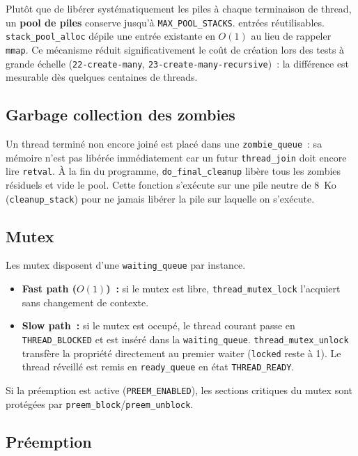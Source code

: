 \documentclass[11pt,a4paper]{article}
\begin{document}
Plut\^ot que de lib\'erer syst\'ematiquement les piles \`a chaque terminaison de
thread, un \textbf{pool de piles} conserve jusqu'\`a \texttt{MAX\_POOL\_STACKS}. entr\'ees r\'eutilisables.
\texttt{stack\_pool\_alloc} d\'epile une entr\'ee existante en $O(1)$ au lieu de
rappeler \texttt{mmap}. Ce m\'ecanisme r\'eduit significativement le co\^ut de
cr\'eation lors des tests \`a grande \'echelle (\texttt{22-create-many},
\texttt{23-create-many-recursive})~: la diff\'erence est mesurable d\`es quelques
centaines de threads.

\subsection{Garbage collection des zombies}

Un thread termin\'e non encore join\'e est plac\'e dans une \texttt{zombie\_queue}~:
sa m\'emoire n'est pas lib\'er\'ee imm\'ediatement car un futur \texttt{thread\_join}
doit encore lire \texttt{retval}. \`A la fin du programme, \texttt{do\_final\_cleanup} lib\`ere tous les zombies r\'esiduels et vide le
pool. Cette fonction s'ex\'ecute sur une pile neutre de 8~Ko (\texttt{cleanup\_stack})
pour ne jamais lib\'erer la pile sur laquelle on s'ex\'ecute.

\subsection{Mutex}

Les mutex disposent d'une \texttt{waiting\_queue} par instance.
\begin{itemize}[noitemsep]
  \item \textbf{Fast path ($O(1)$)~:} si le mutex est libre,
        \texttt{thread\_mutex\_lock} l'acquiert sans changement de contexte.
  \item \textbf{Slow path~:} si le mutex est occup\'e, le thread courant passe en
        \texttt{THREAD\_BLOCKED} et est ins\'er\'e dans la \texttt{waiting\_queue}.
        \texttt{thread\_mutex\_unlock} transfère la propri\'et\'e directement au
        premier waiter (\texttt{locked} reste \`a 1). Le thread r\'eveill\'e est remis en \texttt{ready\_queue}
        en \'etat \texttt{THREAD\_READY}.
\end{itemize}

Si la pr\'eemption est active (\texttt{PREEM\_ENABLED}), les sections critiques
du mutex sont prot\'eg\'ees par \texttt{preem\_block}/\texttt{preem\_unblock}.

\subsection{Pr\'eemption}
\end{document}
